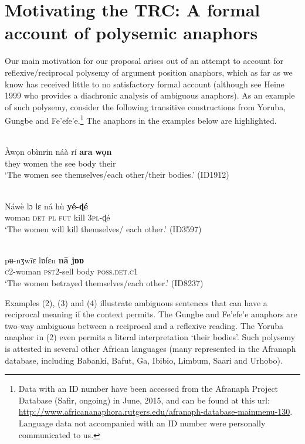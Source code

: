 \documentclass[output=paper]{langsci/langscibook}
\begin{document}
 
\section{Motivating the TRC: A formal account of polysemic anaphors}



  Our main motivation for our proposal arises out of an attempt to account for reflexive/reciprocal polysemy of argument position anaphors, which as far as we know has received little to no satisfactory formal account (although see Heine 1999 who provides a diachronic analysis of ambiguous anaphors). As an example of such polysemy, consider the following transitive constructions from Yoruba, Gungbe and Fe'efe'e.\footnote{ Data with an ID number have been accessed from the Afranaph Project Database (Safir, ongoing) in June, 2015, and can be found at this url: \url{http://www.africananaphora.rutgers.edu/afranaph-database-mainmenu-130}. Language data not accompanied with an ID number were personally communicated to us.} The anaphors in the examples below are highlighted.




\ea\label{ex:}
 \\
\gll Àwọn     obìnrin   náà  rí   \textbf{{ara}}   \textbf{{wọn}} \\
they     women   the   see   body   their\\
\glt  ‘The women see themselves/each other/their bodies.’ {(ID1912)}
\z


\ea\label{ex:}
 \\
\gll Náwè     lɔ  lɛ  ná  hù  \textbf{yé-ɖé} \\
woman    \textsc{det}  \textsc{pl}  \textsc{fut}  kill  \textsc{3pl}-ɖé \\
\glt ‘The women will kill themselves/ each other.’ (ID3597) 
\z


\ea\label{ex:}
 \\
\gll pʉ-nʒw\={i}ɛ   lɒfɛn     \textbf{n\={a}   jɒɒ} \\
  \textsc{c}{2-woman}   {\textsc{pst2}}-sell   body   \textsc{poss.det.c1}\\
\glt ‘The women betrayed themselves/each other.’ {(ID8237)} 
\z


Examples (2), (3) and (4) illustrate ambiguous sentences that can have a reciprocal meaning if the context permits. The Gungbe and Fe'efe'e anaphors are two-way ambiguous between a reciprocal and a reflexive reading. The Yoruba anaphor in (2) even permits a literal interpretation ‘their bodies’. Such polysemy is attested in several other African languages (many represented in the Afranaph database, including Babanki, Bafut, Ga, Ibibio, Limbum, Saari and Urhobo).
\end{document}
